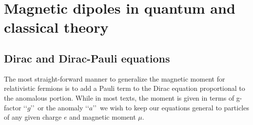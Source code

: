 \chapter{Magnetic dipoles in quantum and classical theory}


\section{Dirac and Dirac-Pauli equations}\label{ajsss:diracpauli}
The most straight-forward manner to generalize the magnetic moment for relativistic fermions is to add a Pauli term to the Dirac equation proportional to the anomalous portion. While in most texts, the moment is given in terms of g-factor \lq\lq$g$\rq\rq\ or the anomaly \lq\lq$a$\rq\rq\ we wish to keep our equations general to particles of any given charge $e$ and magnetic moment $\mu$.


